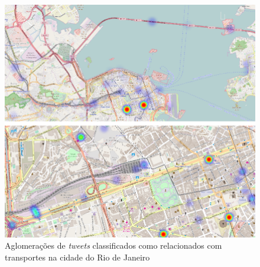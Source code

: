 \documentclass[9pt,a4paper]{extarticle}
\begin{document}
\begin{multicols}{2}
\begin{figure}[H]
	\centerline{\includegraphics[scale=.18]{rio_tweets_transportation.png}}
	\caption{Aglomerações de \emph{tweets} classificados como relacionados com transportes na cidade do Rio de Janeiro}  
	\label{fig:rio_tweets_transportation}
\end{figure}





\end{multicols}
\end{document}
